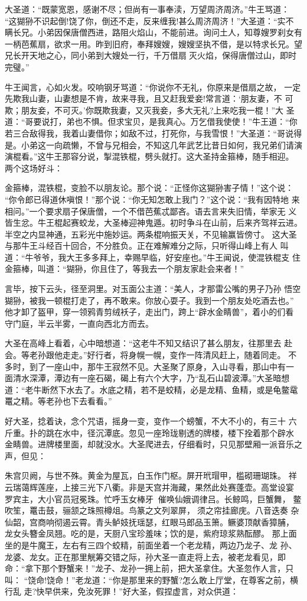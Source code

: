 大圣道：“既蒙宽恩，感谢不尽；但尚有一事奉渎，万望周济周济。”牛王骂道：
“这猢狲不识起倒!饶了你，倒还不走，反来缠我!甚么周济周济！”大圣道：“实不
瞒长兄。小弟因保唐僧西进，路阻火焰山，不能前进。询问土人，知尊嫂罗刹女有
一柄芭蕉扇，欲求一用。昨到旧府，奉拜嫂嫂，嫂嫂坚执不借，是以特求长兄。望
兄长开天地之心，同小弟到大嫂处一行，千万借扇灭火焰，保得唐僧过山，即时
完璧。”

牛王闻言，心如火发。咬响钢牙骂道：“你说你不无礼，你原来是借扇之故，
一定先欺我山妻，山妻想是不肯，故来寻我，且又赶我爱妾!常言道：‘朋友妻，不
可欺；朋友妾，不可灭。’你既欺我妻，又灭我妾，多大无礼?上来吃我一棍！”大
圣道：“哥要说打，弟也不惧。但求宝贝，是我真心。万乞借我使使！”牛王道：“你
若三合敌得我，我着山妻借你；如敌不过，打死你，与我雪恨！”大圣道：“哥说得
是。小弟这一向疏懒，不曾与兄相会，不知这几年武艺比昔日如何，我兄弟们请演
演棍看。”这牛王那容分说，掣混铁棍，劈头就打。这大圣持金箍棒，随手相迎。
两个这场好斗：

金箍棒，混铁棍，变脸不以朋友论。那个说：“正怪你这猢狲害子情！”这个说：
“你令郎已得道休嗔恨！”那个说：“你无知怎敢上我门？”这个说：“我有因特地
来相问。”一个要求扇子保唐僧，一个不借芭蕉忒鄙吝。语去言来失旧情，举家无
义皆生忿。牛王棍起赛蛟龙，大圣棒迎神鬼遁。初时争斗在山前，后来齐驾祥云进。
半空之内显神通，五彩光中施妙运。两条棍响振天关，不见输赢皆傍寸。
这大圣与那牛王斗经百十回合，不分胜负。正在难解难分之际，只听得山峰上有人
叫道：“牛爷爷，我大王多多拜上，幸赐早临，好安座也。”牛王闻说，使混铁棍支
住金箍棒，叫道：“猢狲，你且住了，等我去一个朋友家赴会来者！”

言毕，按下云头，径至洞里。对玉面公主道：“美人，才那雷公嘴的男子乃孙
悟空猢狲，被我一顿棍打走了，再不敢来。你放心耍子。我到一个朋友处吃酒去也。”
他才卸了盔甲，穿一领鸦青剪绒袄子，走出门，跨上“辟水金睛兽”，着小的们看
守门庭，半云半雾，一直向西北方而去。

大圣在高峰上看着，心中暗想道：“这老牛不知又结识了甚么朋友，往那里去
赴会。等老孙跟他走走。”好行者，将身幌一幌，变作一阵清风赶上，随着同走。
不多时，到了一座山中，那牛王寂然不见。大圣聚了原身，入山寻看，那山中有一
面清水深潭，潭边有一座石碣，碣上有六个大字，乃“乱石山碧波潭。”大圣暗想
道：“老牛断然下水去了。水底之精，若不是蛟精，必是龙精、鱼精，或是龟鳖鼋
鼍之精。等老孙也下去看看。”

好大圣，捻着诀，念个咒语，摇身一变，变作一个螃蟹，不大不小的，有三十
六斤重。扑的跳在水中，径沉潭底。忽见一座玲珑剔透的牌楼，楼下拴着那个辟水
金睛兽。进牌楼里面，却就没水。大圣爬进去，仔细看时，只见那壁厢一派音乐之
声，但见：

朱宫贝阙，与世不殊。黄金为屋瓦，白玉作门枢。屏开玳瑁甲，槛砌珊瑚珠。
祥云瑞蔼辉莲座，上接三光下八衢。非是天宫并海藏，果然此处赛蓬壶。高堂设宴
罗宾主，大小官员冠冕珠。忙呼玉女棒牙，催唤仙娥调律吕。长鲸鸣，巨蟹舞，
鳖吹笙，鼍击鼓，骊颔之珠照樽俎。鸟篆之文列翠屏，须之帘挂廊庑。八音迭奏
杂仙韶，宫商响彻遏云霄。青头鲈妓抚瑶瑟，红眼马郎品玉箫。鳜婆顶献香獐脯，
龙女头簪金凤翘。吃的是，天厨八宝珍羞味；饮的是，紫府琼浆熟酝醪。
那上面坐的是牛魔王，左右有三四个蛟精，前面坐着一个老龙精，两边乃龙子、龙
孙、龙婆、龙女。正在那里觥筹交错之际，孙大圣一直走将上去，被老龙看见，即
命：“拿下那个野蟹来！”龙子、龙孙一拥上前，把大圣拿住。大圣忽作人言，只叫：
“饶命!饶命！”老龙道：“你是那里来的野蟹?怎么敢上厅堂，在尊客之前，横行乱
走?快早供来，免汝死罪！”好大圣，假捏虚言，对众供道：

